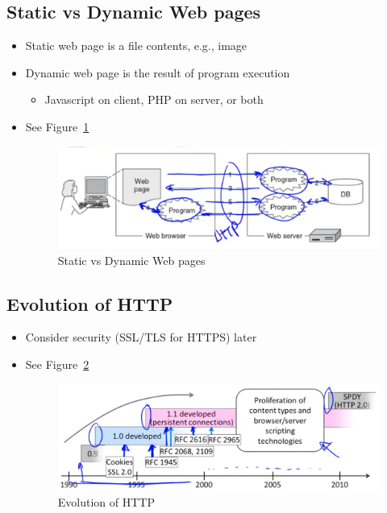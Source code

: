 \documentclass[12pt]{ctexart}   %
\begin{document}
	\subsection{Static vs Dynamic Web pages}
	\begin{itemize}
		\item Static web page is a file contents, e.g., image
		\item Dynamic web page is the result of program execution
		\begin{itemize}
			\item Javascript on client, PHP on server, or both
		\end{itemize}
		\item See Figure~\ref{fig:8-4-5}
		  
		 \begin{figure}[h!] %
		\centering
		 \includegraphics[scale=0.7]{images/8-4-5}
		\caption{ Static vs Dynamic Web pages}
		 \label{fig:8-4-5}
		 \end{figure}
	\end{itemize}
	
	\subsection{Evolution of HTTP}
	\begin{itemize}
		\item Consider security (SSL/TLS for HTTPS) later
		\item See Figure~\ref{fig:8-4-6}
		  
		 \begin{figure}[h!] %
		\centering
		 \includegraphics[scale=0.7]{images/8-4-6}
		\caption{ Evolution of HTTP }
		 \label{fig:8-4-6}
		 \end{figure}
	\end{itemize}
	
\end{document}

